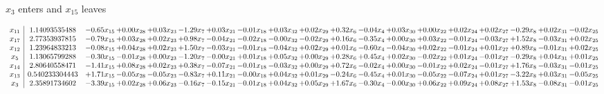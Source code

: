 \documentclass[9pt]{article}
\begin{document}
 $ x_{3} $ enters and $ x_{15} $ leaves 

 \[\begin{array}{c| c c@{\hskip 2pt} c@{\hskip 2pt} c@{\hskip 2pt} c@{\hskip 2pt} c@{\hskip 2pt} c@{\hskip 2pt} c@{\hskip 2pt} c@{\hskip 2pt} c@{\hskip 2pt} c@{\hskip 2pt} c@{\hskip 2pt} c@{\hskip 2pt} c@{\hskip 2pt} c@{\hskip 2pt} c@{\hskip 2pt} c@{\hskip 2pt} c@{\hskip 2pt} }
 x_{11}   &  1.14093535488 & -0.65 x_{15} & +  0.00 x_{28} & +  0.03 x_{23} & -1.29 x_{7} & +  0.03 x_{21} & -0.01 x_{18} & +  0.03 x_{32} & +  0.02 x_{29} & +  0.32 x_{6} & -0.04 x_{4} & +  0.03 x_{30} & +  0.00 x_{22} & +  0.02 x_{24} & +  0.02 x_{27} & -0.29 x_{8} & +  0.02 x_{31} & -0.02 x_{25}\\
 x_{17}   &  2.77353937815 & -0.79 x_{15} & +  0.03 x_{28} & +  0.02 x_{23} & +  0.98 x_{7} & -0.04 x_{21} & -0.02 x_{18} & -0.00 x_{32} & -0.02 x_{29} & +  0.16 x_{6} & -0.35 x_{4} & +  0.00 x_{30} & +  0.03 x_{22} & -0.01 x_{24} & -0.03 x_{27} & +  1.52 x_{8} & -0.03 x_{31} & +  0.02 x_{25}\\
 x_{12}   &  1.23964833213 & -0.08 x_{15} & +  0.04 x_{28} & +  0.02 x_{23} & +  1.50 x_{7} & -0.03 x_{21} & -0.01 x_{18} & -0.04 x_{32} & +  0.02 x_{29} & +  0.01 x_{6} & -0.60 x_{4} & -0.04 x_{30} & +  0.02 x_{22} & -0.01 x_{24} & +  0.01 x_{27} & +  0.89 x_{8} & -0.01 x_{31} & +  0.02 x_{25}\\
 x_{5}   &  1.13065799288 & -0.30 x_{15} & -0.01 x_{28} & +  0.00 x_{23} & -1.20 x_{7} & -0.00 x_{21} & +  0.01 x_{18} & +  0.05 x_{32} & +  0.00 x_{29} & +  0.28 x_{6} & +  0.45 x_{4} & +  0.02 x_{30} & -0.02 x_{22} & +  0.01 x_{24} & -0.01 x_{27} & -0.29 x_{8} & +  0.04 x_{31} & +  0.01 x_{25}\\
 x_{14}   &  2.80640558471 & -1.41 x_{15} & +  0.08 x_{28} & +  0.02 x_{23} & +  0.38 x_{7} & -0.07 x_{21} & -0.01 x_{18} & -0.03 x_{32} & +  0.00 x_{29} & +  0.72 x_{6} & -0.02 x_{4} & +  0.00 x_{30} & -0.01 x_{22} & +  0.02 x_{24} & -0.01 x_{27} & +  1.76 x_{8} & -0.03 x_{31} & -0.01 x_{25}\\
 x_{13}   &  0.540233304443 & +  1.71 x_{15} & -0.05 x_{28} & -0.05 x_{23} & -0.83 x_{7} & +  0.11 x_{21} & -0.00 x_{18} & +  0.04 x_{32} & +  0.01 x_{29} & -0.24 x_{6} & -0.45 x_{4} & +  0.01 x_{30} & -0.05 x_{22} & -0.07 x_{24} & +  0.01 x_{27} & -3.22 x_{8} & +  0.03 x_{31} & -0.05 x_{25}\\
 x_{3}   &  2.35891734602 & -3.39 x_{15} & +  0.02 x_{28} & +  0.06 x_{23} & -0.16 x_{7} & -0.15 x_{21} & -0.01 x_{18} & +  0.04 x_{32} & +  0.05 x_{29} & +  1.67 x_{6} & -0.30 x_{4} & -0.00 x_{30} & +  0.06 x_{22} & +  0.09 x_{24} & +  0.08 x_{27} & +  1.53 x_{8} & -0.08 x_{31} & -0.01 x_{25}\\

\end{array}\]
\end{document}
